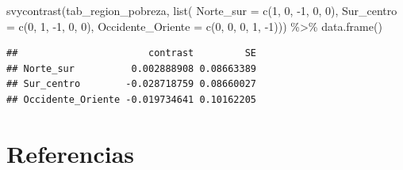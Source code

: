\documentclass[
  12pt,
]{book}
\newenvironment{Shaded}{\begin{snugshade}}{\end{snugshade}}
\newcommand{\AttributeTok}[1]{\textcolor[rgb]{0.77,0.63,0.00}{#1}}
\newcommand{\DecValTok}[1]{\textcolor[rgb]{0.00,0.00,0.81}{#1}}
\newcommand{\FunctionTok}[1]{\textcolor[rgb]{0.00,0.00,0.00}{#1}}
\newcommand{\NormalTok}[1]{#1}
\newcommand{\SpecialCharTok}[1]{\textcolor[rgb]{0.00,0.00,0.00}{#1}}
\begin{document}
\begin{Shaded}
\begin{Highlighting}[]
\FunctionTok{svycontrast}\NormalTok{(tab\_region\_pobreza, }\FunctionTok{list}\NormalTok{(}
                \AttributeTok{Norte\_sur =} \FunctionTok{c}\NormalTok{(}\DecValTok{1}\NormalTok{, }\DecValTok{0}\NormalTok{, }\SpecialCharTok{{-}}\DecValTok{1}\NormalTok{, }\DecValTok{0}\NormalTok{, }\DecValTok{0}\NormalTok{),}
                \AttributeTok{Sur\_centro =} \FunctionTok{c}\NormalTok{(}\DecValTok{0}\NormalTok{, }\DecValTok{1}\NormalTok{, }\SpecialCharTok{{-}}\DecValTok{1}\NormalTok{, }\DecValTok{0}\NormalTok{, }\DecValTok{0}\NormalTok{),}
                \AttributeTok{Occidente\_Oriente =} \FunctionTok{c}\NormalTok{(}\DecValTok{0}\NormalTok{, }\DecValTok{0}\NormalTok{, }\DecValTok{0}\NormalTok{, }\DecValTok{1}\NormalTok{, }\SpecialCharTok{{-}}\DecValTok{1}\NormalTok{))) }\SpecialCharTok{\%\textgreater{}\%} \FunctionTok{data.frame}\NormalTok{()}
\end{Highlighting}
\end{Shaded}

\begin{verbatim}
##                       contrast         SE
## Norte_sur          0.002888908 0.08663389
## Sur_centro        -0.028718759 0.08660027
## Occidente_Oriente -0.019734641 0.10162205
\end{verbatim}

\hypertarget{referencias}{%
\chapter{Referencias}\label{referencias}}
\end{document}
